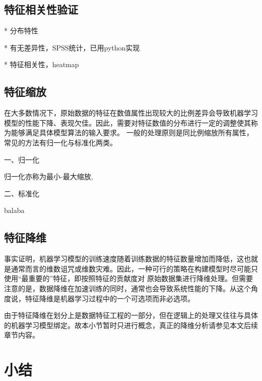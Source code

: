 \subsection{特征相关性验证}
* 分布特性

  * 有无差异性，SPSS统计，已用python实现

  * 特征相关性，heatmap
\subsection{特征缩放}
在大多数情况下，原始数据的特征在数值属性出现较大的比例差异会导致机器学习模型的性能下降、表现欠佳\cite{Aurélien2018}。因此，需要对特征数值的分布进行一定的调整使其称为能够满足具体模型算法的输入要求。
一般的处理原则是同比例缩放所有属性，常见的方法有归一化与标准化两类。

一、归一化

归一化亦称为最小-最大缩放,

二、标准化

balaba
\subsection{特征降维}
事实证明，机器学习模型的训练速度随着训练数据的特征数量增加而降低，这也就是通常而言的维数诅咒或维数灾难。因此，一种可行的策略在构建模型时尽可能只使用“最重要的”特征，即按照特征的贡献度对
原始数据集进行降维处理。但需要注意的是，数据降维在加速训练的同时，通常也会导致系统性能的下降。从这个角度说，特征降维是机器学习过程中的一个可选项而非必选项。

由于特征降维在划分上是数据特征工程的一部分，但在逻辑上的处理又往往与具体的机器学习模型绑定。故本小节暂时只进行概念，真正的降维分析请参见本文后续章节内容。
\section{小结}